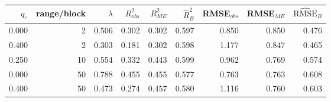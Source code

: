 \begin{tabular}{rrrrrrrrr}
\toprule
$q_\varepsilon$ & range/block & $\lambda$ & $R^2_{obs}$ & $R^2_{ME}$ & $\hat R^2_B$ & RMSE$_{obs}$ & RMSE$_{ME}$ & $\widehat{\mathrm{RMSE}}_B$ \\
\midrule
0.000 & 2 & 0.506 & 0.302 & 0.302 & 0.597 & 0.850 & 0.850 & 0.476 \\
0.400 & 2 & 0.303 & 0.181 & 0.302 & 0.598 & 1.177 & 0.847 & 0.465 \\
0.250 & 10 & 0.554 & 0.332 & 0.443 & 0.599 & 0.962 & 0.769 & 0.574 \\
0.000 & 50 & 0.788 & 0.455 & 0.455 & 0.577 & 0.763 & 0.763 & 0.608 \\
0.400 & 50 & 0.473 & 0.274 & 0.457 & 0.580 & 1.116 & 0.760 & 0.603 \\
\bottomrule
\end{tabular}
